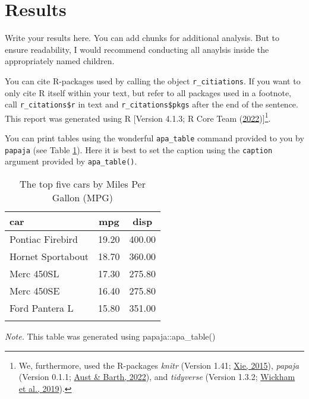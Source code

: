 \documentclass[
  man,floatsintext]{apa7}
\begin{document}
\hypertarget{results}{%
\section{Results}\label{results}}

Write your results here. You can add chunks for additional analysis. But to ensure readability, I would recommend conducting all anaylsis inside the appropriately named children.

You can cite R-packages used by calling the object \texttt{r\_citiations}. If you want to only cite R itself within your text, but refer to all packages used in a footnote, call \texttt{r\_citations\$r} in text and \texttt{r\_citations\$pkgs} after the end of the sentence. This report was generated using R {[}Version 4.1.3; R Core Team (\protect\hyperlink{ref-R-base}{2022}){]}\footnote{We, furthermore, used the R-packages \emph{knitr} (Version 1.41; \protect\hyperlink{ref-R-knitr}{Xie, 2015}), \emph{papaja} (Version 0.1.1; \protect\hyperlink{ref-R-papaja}{Aust \& Barth, 2022}), and \emph{tidyverse} (Version 1.3.2; \protect\hyperlink{ref-R-tidyverse}{Wickham et al., 2019}).}.

You can print tables using the wonderful \texttt{apa\_table} command provided to you by \texttt{papaja} (see Table \ref{tab:results-example-table}). Here it is best to set the caption using the \texttt{caption} argument provided by \texttt{apa\_table()}.

\begin{table}[tbp]

\begin{center}
\begin{threeparttable}

\caption{\label{tab:results-example-table}The top five cars by Miles Per Gallon (MPG)}

\begin{tabular}{lll}
\toprule
car & \multicolumn{1}{c}{mpg} & \multicolumn{1}{c}{disp}\\
\midrule
Pontiac Firebird & 19.20 & 400.00\\
Hornet Sportabout & 18.70 & 360.00\\
Merc 450SL & 17.30 & 275.80\\
Merc 450SE & 16.40 & 275.80\\
Ford Pantera L & 15.80 & 351.00\\
\bottomrule
\addlinespace
\end{tabular}

\begin{tablenotes}[para]
\normalsize{\textit{Note.} This table was generated using papaja::apa\_table()}
\end{tablenotes}

\end{threeparttable}
\end{center}

\end{table}
\end{document}
